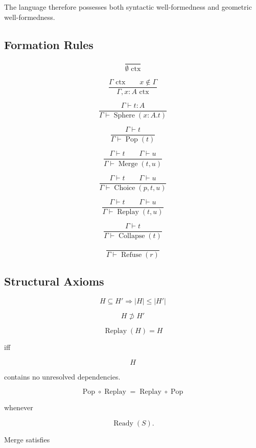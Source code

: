 \documentclass[12pt,oneside]{article}
\theoremstyle{definition}
\theoremstyle{remark}
\begin{document}
The language therefore possesses both syntactic well-formedness and
geometric well-formedness.

\subsection*{Formation Rules}

\[
\frac{}
{\emptyset
\text{ ctx}}
\]

\[
\frac
{\Gamma
\text{ ctx}
\qquad
x\notin\Gamma}
{\Gamma,x:A
\text{ ctx}}
\]

\[
\frac
{\Gamma\vdash t:A}
{\Gamma\vdash
\operatorname{Sphere}(x:A.t)
}
\]

\[
\frac
{\Gamma\vdash t}
{\Gamma\vdash
\operatorname{Pop}(t)}
\]

\[
\frac
{\Gamma\vdash t
\qquad
\Gamma\vdash u}
{\Gamma\vdash
\operatorname{Merge}(t,u)}
\]

\[
\frac
{\Gamma\vdash t
\qquad
\Gamma\vdash u}
{\Gamma\vdash
\operatorname{Choice}(p,t,u)}
\]

\[
\frac
{\Gamma\vdash t
\qquad
\Gamma\vdash u}
{\Gamma\vdash
\operatorname{Replay}(t,u)}
\]

\[
\frac
{\Gamma\vdash t}
{\Gamma\vdash
\operatorname{Collapse}(t)}
\]

\[
\frac{}
{\Gamma\vdash
\operatorname{Refuse}(r)}
\]

\subsection*{Structural Axioms}

\[
H
\subseteq
H'
\Longrightarrow
|H|
\le
|H'|
\]

\[
H
\not\supset
H'
\]

\[
\operatorname{Replay}
(H)
=
H
\]

iff

\[
H
\]

contains no unresolved dependencies.

\[
\operatorname{Pop}
\circ
\operatorname{Replay}
=
\operatorname{Replay}
\circ
\operatorname{Pop}
\]

whenever

\[
\operatorname{Ready}(S).
\]

Merge satisfies
\end{document}
